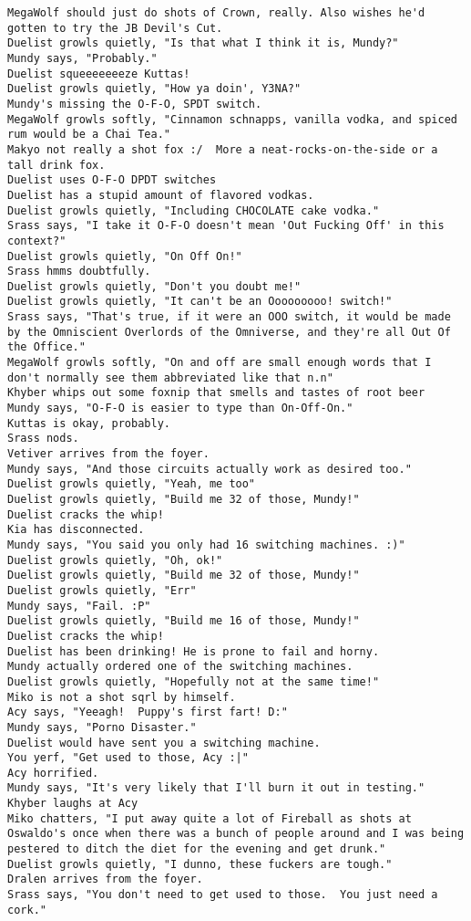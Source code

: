 \begin{verbatim}
MegaWolf should just do shots of Crown, really. Also wishes he'd gotten to try the JB Devil's Cut.
Duelist growls quietly, "Is that what I think it is, Mundy?"
Mundy says, "Probably."
Duelist squeeeeeeeze Kuttas!
Duelist growls quietly, "How ya doin', Y3NA?"
Mundy's missing the O-F-O, SPDT switch.
MegaWolf growls softly, "Cinnamon schnapps, vanilla vodka, and spiced rum would be a Chai Tea."
Makyo not really a shot fox :/  More a neat-rocks-on-the-side or a tall drink fox.
Duelist uses O-F-O DPDT switches
Duelist has a stupid amount of flavored vodkas.
Duelist growls quietly, "Including CHOCOLATE cake vodka."
Srass says, "I take it O-F-O doesn't mean 'Out Fucking Off' in this context?"
Duelist growls quietly, "On Off On!"
Srass hmms doubtfully.
Duelist growls quietly, "Don't you doubt me!"
Duelist growls quietly, "It can't be an Ooooooooo! switch!"
Srass says, "That's true, if it were an OOO switch, it would be made by the Omniscient Overlords of the Omniverse, and they're all Out Of the Office."
MegaWolf growls softly, "On and off are small enough words that I don't normally see them abbreviated like that n.n"
Khyber whips out some foxnip that smells and tastes of root beer
Mundy says, "O-F-O is easier to type than On-Off-On."
Kuttas is okay, probably.
Srass nods.
Vetiver arrives from the foyer.
Mundy says, "And those circuits actually work as desired too."
Duelist growls quietly, "Yeah, me too"
Duelist growls quietly, "Build me 32 of those, Mundy!"
Duelist cracks the whip!
Kia has disconnected.
Mundy says, "You said you only had 16 switching machines. :)"
Duelist growls quietly, "Oh, ok!"
Duelist growls quietly, "Build me 32 of those, Mundy!"
Duelist growls quietly, "Err"
Mundy says, "Fail. :P"
Duelist growls quietly, "Build me 16 of those, Mundy!"
Duelist cracks the whip!
Duelist has been drinking! He is prone to fail and horny.
Mundy actually ordered one of the switching machines.
Duelist growls quietly, "Hopefully not at the same time!"
Miko is not a shot sqrl by himself.
Acy says, "Yeeagh!  Puppy's first fart! D:"
Mundy says, "Porno Disaster."
Duelist would have sent you a switching machine.
You yerf, "Get used to those, Acy :|"
Acy horrified.
Mundy says, "It's very likely that I'll burn it out in testing."
Khyber laughs at Acy
Miko chatters, "I put away quite a lot of Fireball as shots at Oswaldo's once when there was a bunch of people around and I was being pestered to ditch the diet for the evening and get drunk."
Duelist growls quietly, "I dunno, these fuckers are tough."
Dralen arrives from the foyer.
Srass says, "You don't need to get used to those.  You just need a cork."

\end{verbatim}
